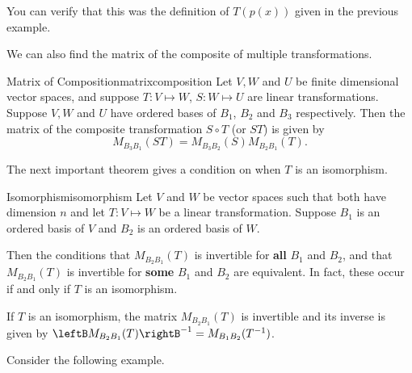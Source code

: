 \begin{solution}
You can verify that this was the definition of $T(p(x))$ given in the previous example.
\end{solution}

We can also find the matrix of the composite of multiple transformations.

\begin{theorem}{Matrix of Composition}{matrixcomposition}
Let $V,W$ and $U$ be finite dimensional vector spaces, and suppose $T : V \mapsto W$, $S: W \mapsto U$ are linear transformations. 
Suppose $V, W$ and $U$ have ordered bases of $B_1$, $B_2$ and $B_3$ respectively.  Then the matrix of the composite transformation $S \circ T$ (or $ST$) is given by 
\[ M_{B_3B_1}(ST)=M_{B_3B_2}(S) M_{B_2B_1}(T).\]
\end{theorem}

The next important theorem gives a condition on when $T$ is an isomorphism.

\begin{theorem}{Isomorphism}{isomorphism}
Let $V$ and $W$ be vector spaces such that both have dimension $n$ and let $T: V \mapsto W$ be a linear transformation. Suppose $B_1$ is an ordered basis of $V$ and $B_2$ is an ordered basis of $W$. 

 Then the conditions that $M_{B_2B_1}(T)$ is invertible for \textbf{all} $B_1$ and $B_2$, and that $M_{B_2B_1}(T)$ is invertible for \textbf{some} $B_1$ and $B_2$ are equivalent. In fact, these occur if and only if $T$ is an isomorphism. 

If $T$ is an isomorphism, the matrix $M_{B_2B_1}(T)$ is invertible and its inverse is given by $\leftB M_{B_2B_1}(T) \rightB ^{-1} = M_{B_1B_2}(T^{-1})$.
\end{theorem}

Consider the following example.

